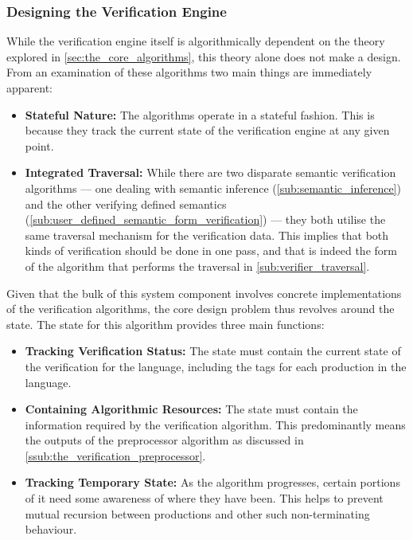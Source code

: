 
\subsubsection{Designing the Verification Engine} %
\label{ssub:designing_the_verification_engine}
While the verification engine itself is algorithmically dependent on the theory explored in \autoref{sec:the_core_algorithms}, this theory alone does not make a design. 
From an examination of these algorithms two main things are immediately apparent:
\begin{itemize}
    \item \textbf{Stateful Nature:} The algorithms operate in a stateful fashion.
    This is because they track the current state of the verification engine at any given point.
    \item \textbf{Integrated Traversal:} While there are two disparate semantic verification algorithms --- one dealing with semantic inference (\autoref{sub:semantic_inference}) and the other verifying defined semantics (\autoref{sub:user_defined_semantic_form_verification}) --- they both utilise the same traversal mechanism for the verification data. 
    This implies that both kinds of verification should be done in one pass, and that is indeed the form of the algorithm that performs the traversal in \autoref{sub:verifier_traversal}. 
\end{itemize}

Given that the bulk of this system component involves concrete implementations of the verification algorithms, the core design problem thus revolves around the state. 
The state for this algorithm provides three main functions:
\begin{itemize}
    \item \textbf{Tracking Verification Status:} The state must contain the current state of the verification for the language, including the tags for each production in the language.
    \item \textbf{Containing Algorithmic Resources:} The state must contain the information required by the verification algorithm.
    This predominantly means the outputs of the preprocessor algorithm as discussed in \autoref{ssub:the_verification_preprocessor}.
    \item \textbf{Tracking Temporary State:} As the algorithm progresses, certain portions of it need some awareness of where they have been.
    This helps to prevent mutual recursion between productions and other such non-terminating behaviour. 
\end{itemize}

